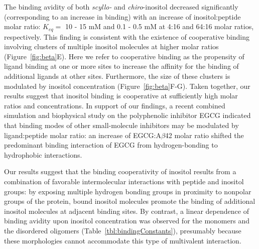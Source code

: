 The binding avidity of both \emph{scyllo-} and \emph{chiro}-inositol decreased significantly (corresponding to an increase in binding) with an increase of inositol:peptide molar ratio: $K_{eq}=$ 10 - 15 mM and 0.1 - 0.5 mM at 4:16 and 64:16 molar ratios, respectively.  This finding is consistent with the existence of cooperative binding involving clusters of multiple inositol molecules at higher molar ratios (Figure~{\ref{fig:beta}}E). Here we refer to cooperative binding as the propensity of ligand binding at one or more sites to increase the affinity for the binding of additional ligands at other sites. Furthermore, the size of these clusters is modulated by inositol concentration (Figure~{\ref{fig:beta}}F-G). Taken together, our results suggest that inositol binding is cooperative at sufficiently high molar ratios and concentrations. In support of our findings, a recent combined simulation and biophysical study on the polyphenolic inhibitor EGCG indicated that binding modes of other small-molecule inhibitors may be modulated by ligand:peptide molar ratio:  an increase of EGCG:A$\beta$42 molar ratio shifted the predominant binding interaction of EGCG from hydrogen-bonding to hydrophobic interactions.\cite{Wang:2010p204}


Our results suggest that the binding cooperativity of inositol results from a combination of favorable intermolecular interactions with peptide and inositol groups: by exposing multiple hydrogen bonding groups in proximity to nonpolar groups of the protein, bound inositol molecules promote the binding of additional inositol molecules at adjacent binding sites.
By contrast, a linear dependence of binding avidity upon inositol concentration was observed for the monomers and the disordered oligomers (Table~{\ref{tbl:bindingConstants}}), presumably because these morphologies cannot accommodate this type of multivalent interaction.
 
